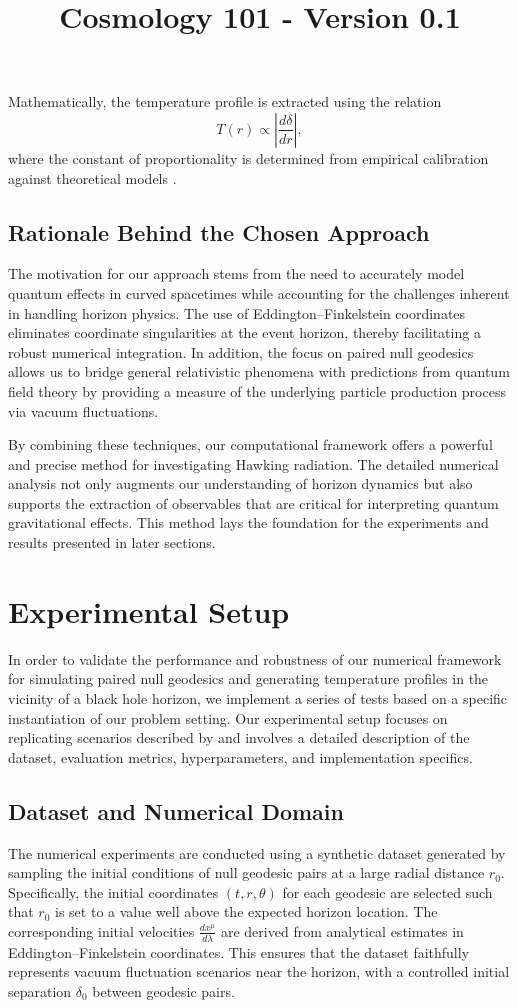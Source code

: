\documentclass{article}\usepackage{graphicx} \usepackage{amsmath} \usepackage{colortbl}\title{Cosmology 101 - Version 0.1}
\begin{document}
Mathematically, the temperature profile is extracted using the relation
\begin{equation}
T(r) \propto \left| \frac{d\delta}{dr}\right|, 
\end{equation}
where the constant of proportionality is determined from empirical calibration against theoretical models \cite{Unruh1976}. 

\subsection{Rationale Behind the Chosen Approach}
The motivation for our approach stems from the need to accurately model quantum effects in curved spacetimes while accounting for the challenges inherent in handling horizon physics. The use of Eddington–Finkelstein coordinates eliminates coordinate singularities at the event horizon, thereby facilitating a robust numerical integration. In addition, the focus on paired null geodesics allows us to bridge general relativistic phenomena with predictions from quantum field theory by providing a measure of the underlying particle production process via vacuum fluctuations.

By combining these techniques, our computational framework offers a powerful and precise method for investigating Hawking radiation. The detailed numerical analysis not only augments our understanding of horizon dynamics but also supports the extraction of observables that are critical for interpreting quantum gravitational effects. This method lays the foundation for the experiments and results presented in later sections.\section{Experimental Setup}
In order to validate the performance and robustness of our numerical framework for simulating paired null geodesics and generating temperature profiles in the vicinity of a black hole horizon, we implement a series of tests based on a specific instantiation of our problem setting. Our experimental setup focuses on replicating scenarios described by \cite{Hawking1975 Jacobson1993 Unruh1976} and involves a detailed description of the dataset, evaluation metrics, hyperparameters, and implementation specifics.

\subsection{Dataset and Numerical Domain}
The numerical experiments are conducted using a synthetic dataset generated by sampling the initial conditions of null geodesic pairs at a large radial distance $r_{0}$. Specifically, the initial coordinates $(t, r, \theta)$ for each geodesic are selected such that $r_{0}$ is set to a value well above the expected horizon location. The corresponding initial velocities $\frac{dx^{\mu}}{d\lambda}$ are derived from analytical estimates in Eddington--Finkelstein coordinates. This ensures that the dataset faithfully represents vacuum fluctuation scenarios near the horizon, with a controlled initial separation $\delta_{0}$ between geodesic pairs.
\end{document}
